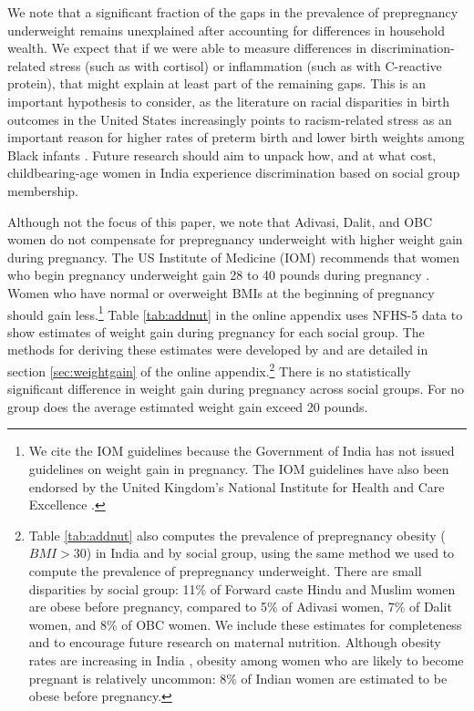 \documentclass[12pt]{article}
\begin{document}
We note that a significant fraction of the gaps in the prevalence of prepregnancy underweight remains unexplained after accounting for differences in household wealth.  We expect that if we were able to measure differences in discrimination-related stress (such as with cortisol) or inflammation (such as with C-reactive protein), that might explain at least part of the remaining gaps.  This is an important hypothesis to consider, as the literature on racial disparities in birth outcomes in the United States increasingly points to racism-related stress as an important reason for higher rates of preterm birth and lower birth weights among Black infants \citep{hogue2005stress, braveman2015role, sosnaud2021cross}. Future research should aim to unpack how, and at what cost, childbearing-age women in India experience discrimination based on social group membership.  

Although not the focus of this paper, we note that Adivasi, Dalit, and OBC women do not compensate for prepregnancy underweight with higher weight gain during pregnancy.  The US Institute of Medicine (IOM) recommends that women who begin pregnancy underweight gain 28 to 40 pounds during pregnancy \citep{iom2009weightgain}. Women who have normal or overweight BMIs at the beginning of pregnancy should gain less.\footnote{We cite the IOM guidelines because the Government of India has not issued guidelines on weight gain in pregnancy. The IOM guidelines have also been endorsed by the United Kingdom's National Institute for Health and Care Excellence \citep{NICE2025}.}  Table \ref{tab:addnut} in the online appendix uses NFHS-5 data to show estimates of weight gain during pregnancy for each social group. The methods for deriving these estimates were developed by \cite{coffey2015prepregnancy} and are detailed in section \ref{sec:weightgain} of the online appendix.\footnote{Table \ref{tab:addnut} also computes the prevalence of prepregnancy obesity ($BMI>30$) in India and by social group, using the same method we used to compute the prevalence of prepregnancy underweight.  There are small disparities by social group: 11\% of Forward caste Hindu and Muslim women are obese before pregnancy, compared to 5\% of Adivasi women, 7\% of Dalit women, and 8\% of OBC women.  We include these estimates for completeness and to encourage future research on maternal nutrition.  Although obesity rates are increasing in India \citep{luhar2020forecasting}, obesity among women who are likely to become pregnant is relatively uncommon: 8\% of Indian women are estimated to be obese before pregnancy.} There is no statistically significant difference in weight gain during pregnancy across social groups.  For no group does the average estimated weight gain exceed 20 pounds. 
\end{document}
